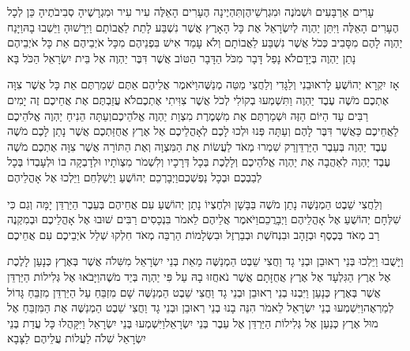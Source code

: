 \documentclass[../main/main.tex]{subfiles}
\begin{document}
\begin{multicols*}{\ncols}
עָרִים אַרְבָּעִים וּשְׁמֹנֶה וּמִגְרְשֵׁיהֶן\PreVerseSpace{}תִּהְיֶינָה הֶעָרִים הָאֵלֶּה עִיר עִיר וּמִגְרָשֶׁיהָ סְבִיבֹתֶיהָ כֵּן לְכָל הֶעָרִים הָאֵלֶּה \ClosedSection{}וַיִּתֵּן יַהְוֶה לְיִשְׂרָאֵל אֶת כָּל הָאָרֶץ אֲשֶׁר נִשְׁבַּע לָתֵת לַאֲבוֹתָם וַיִּרָשׁוּהָ וַיֵּשְׁבוּ בָהּ\PreVerseSpace{}וַיָּנַח יַהְוֶה לָהֶם מִסָּבִיב כְּכֹל אֲשֶׁר נִשְׁבַּע לַאֲבוֹתָם וְלֹא עָמַד אִישׁ בִּפְנֵיהֶם מִכָּל אֹיְבֵיהֶם אֵת כָּל אֹיְבֵיהֶם נָתַן יַהְוֶה בְּיָדָם\PreVerseSpace{}לֹא נָפַל דָּבָר מִכֹּל הַדָּבָר הַטּוֹב אֲשֶׁר דִּבֶּר יַהְוֶה אֶל בֵּית יִשְׂרָאֵל הַכֹּל בָּא\OpenSection{}\par
{}אָז יִקְרָא יְהוֹשֻׁעַ לָראוּבֵנִי וְלַגָּדִי וְלַחֲצִי מַטֵּה מְנַשֶּׁה\PreVerseSpace{}וַיֹּאמֶר אֲלֵיהֶם אַתֶּם שְׁמַרְתֶּם אֵת כָּל אֲשֶׁר צִוָּה אֶתְכֶם מֹשֶׁה עֶבֶד יַהְוֶה וַתִּשְׁמְעוּ בְקוֹלִי לְכֹל אֲשֶׁר צִוִּיתִי אֶתְכֶם\PreVerseSpace{}לֹא עֲזַבְתֶּם אֶת אֲחֵיכֶם זֶה יָמִים רַבִּים עַד הַיּוֹם הַזֶּה וּשְׁמַרְתֶּם אֶת מִשְׁמֶרֶת מִצְוַת יַהְוֶה אֱלֹהֵיכֶם\PreVerseSpace{}וְעַתָּה הֵנִיחַ יַהְוֶה אֱלֹהֵיכֶם לַאֲחֵיכֶם כַּאֲשֶׁר דִּבֶּר לָהֶם וְעַתָּה פְּנוּ וּלְכוּ לָכֶם לְאָהֳלֵיכֶם אֶל אֶרֶץ אֲחֻזַּתְכֶם אֲשֶׁר נָתַן לָכֶם מֹשֶׁה עֶבֶד יַהְוֶה בְּעֵבֶר הַיַּרְדֵּן\PreVerseSpace{}רַק שִׁמְרוּ מְאֹד לַעֲשׂוֹת אֶת הַמִּצְוָה וְאֶת הַתּוֹרָה אֲשֶׁר צִוָּה אֶתְכֶם מֹשֶׁה עֶבֶד יַהְוֶה לְאַהֲבָה אֶת יַהְוֶה אֱלֹהֵיכֶם וְלָלֶכֶת בְּכָל דְּרָכָיו וְלִשְׁמֹר מִצְוֺתָיו וּלְדָבְקָה בוֹ וּלְעָבְדוֹ בְּכָל לְבַבְכֶם וּבְכָל נַפְשְׁכֶם\PreVerseSpace{}וַיְבָרְכֵם יְהוֹשֻׁעַ וַיְשַׁלְּחֵם וַיֵּלְכוּ אֶל אָהֳלֵיהֶם\OpenSection{}\par
{}וְלַחֲצִי שֵׁבֶט הַמְנַשֶּׁה נָתַן מֹשֶׁה בַּבָּשָׁן וּלְחֶצְיוֹ נָתַן יְהוֹשֻׁעַ עִם אֲחֵיהֶם בְּעֵבֶר\SubEnd{} הַיַּרְדֵּן יָמָּה וְגַם כִּי שִׁלְּחָם יְהוֹשֻׁעַ אֶל אָהֳלֵיהֶם וַיְבָרֲכֵם\PreVerseSpace{}וַיֹּאמֶר אֲלֵיהֶם לֵאמֹר בִּנְכָסִים רַבִּים שׁוּבוּ אֶל אָהֳלֵיכֶם וּבְמִקְנֶה רַב מְאֹד בְּכֶסֶף וּבְזָהָב וּבִנְחֹשֶׁת וּבְבַרְזֶל וּבִשְׂלָמוֹת הַרְבֵּה מְאֹד חִלְקוּ שְׁלַל אֹיְבֵיכֶם עִם אֲחֵיכֶם\OpenSection{}\par
{}וַיָּשֻׁבוּ וַיֵּלְכוּ בְּנֵי רְאוּבֵן וּבְנֵי גָד וַחֲצִי שֵׁבֶט הַמְנַשֶּׁה מֵאֵת בְּנֵי יִשְׂרָאֵל מִשִּׁלֹה אֲשֶׁר בְּאֶרֶץ כְּנָעַן לָלֶכֶת אֶל אֶרֶץ הַגִּלְעָד אֶל אֶרֶץ אֲחֻזָּתָם אֲשֶׁר נֹאחֲזוּ בָהּ עַל פִּי יַהְוֶה בְּיַד מֹשֶׁה\PreVerseSpace{}וַיָּבֹאוּ אֶל גְּלִילוֹת הַיַּרְדֵּן אֲשֶׁר בְּאֶרֶץ כְּנָעַן וַיִּבְנוּ בְנֵי רְאוּבֵן וּבְנֵי גָד וַחֲצִי שֵׁבֶט הַמְנַשֶּׁה שָׁם מִזְבֵּחַ עַל הַיַּרְדֵּן מִזְבֵּחַ גָּדוֹל לְמַרְאֶה\PreVerseSpace{}וַיִּשְׁמְעוּ בְנֵי יִשְׂרָאֵל לֵאמֹר הִנֵּה בָנוּ בְנֵי רְאוּבֵן וּבְנֵי גָד וַחֲצִי שֵׁבֶט הַמְנַשֶּׁה אֶת הַמִּזְבֵּחַ אֶל מוּל אֶרֶץ כְּנַעַן אֶל גְּלִילוֹת הַיַּרְדֵּן אֶל עֵבֶר בְּנֵי יִשְׂרָאֵל\PreVerseSpace{}וַיִּשְׁמְעוּ בְּנֵי יִשְׂרָאֵל וַיִּקָּהֲלוּ כָּל עֲדַת בְּנֵי יִשְׂרָאֵל שִׁלֹה לַעֲלוֹת עֲלֵיהֶם לַצָּבָא\OpenSection{}\par

\end{multicols*}
\end{document}
